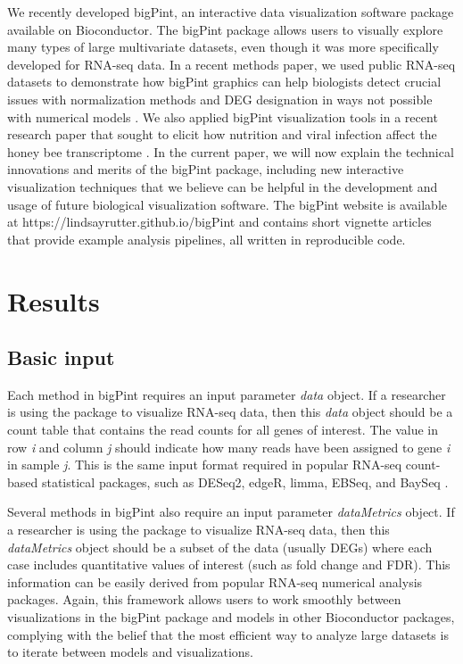 \documentclass[parskip=full]{bmcart} %
\begin{document}
We recently developed bigPint, an interactive data visualization software package available on Bioconductor. The bigPint package allows users to visually explore many types of large multivariate datasets, even though it was more specifically developed for RNA-seq data. In a recent methods paper, we used public RNA-seq datasets to demonstrate how bigPint graphics can help biologists detect crucial issues with normalization methods and DEG designation in ways not possible with numerical models \cite{rutter1}. We also applied bigPint visualization tools in a recent research paper that sought to elicit how nutrition and viral infection affect the honey bee transcriptome \cite{rutter2}. In the current paper, we will now explain the technical innovations and merits of the bigPint package, including new interactive visualization techniques that we believe can be helpful in the development and usage of future biological visualization software. The bigPint website is available at https://lindsayrutter.github.io/bigPint and contains short vignette articles that provide example analysis pipelines, all written in reproducible code.

\section*{Results}

\subsection*{Basic input}

Each method in bigPint requires an input parameter \textit{data} object. If a researcher is using the package to visualize RNA-seq data, then this \textit{data} object should be a count table that contains the read counts for all genes of interest. The value in row \textit{i} and column \textit{j} should indicate how many reads have been assigned to gene \textit{i} in sample \textit{j}. This is the same input format required in popular RNA-seq count-based statistical packages, such as DESeq2, edgeR, limma, EBSeq, and BaySeq \cite{deseq2, edger, limma, ebseq, bayseq}. 

Several methods in bigPint also require an input parameter \textit{dataMetrics} object. If a researcher is using the package to visualize RNA-seq data, then this \textit{dataMetrics} object should be a subset of the data (usually DEGs) where each case includes quantitative values of interest (such as fold change and FDR). This information can be easily derived from popular RNA-seq numerical analysis packages. Again, this framework allows users to work smoothly between visualizations in the bigPint package and models in other Bioconductor packages, complying with the belief that the most efficient way to analyze large datasets is to iterate between models and visualizations.
\end{document}
